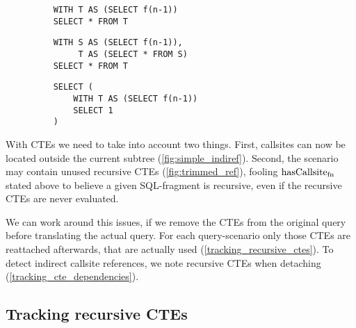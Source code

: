 \begin{wrapfigure}{r}{.5\textwidth}
    \begin{minipage}{\linewidth}
    \centering \captionsetup[subfigure]{justification=centering}
    \begin{verbatim}
    WITH T AS (SELECT f(n-1))
    SELECT * FROM T
    \end{verbatim}
    \label{fig:simple_indiref}\par\vfill
    \begin{verbatim}
    WITH S AS (SELECT f(n-1)),
         T AS (SELECT * FROM S)
    SELECT * FROM T
    \end{verbatim}
    \label{fib_nonrec_scenarios}\par\vfill
    \begin{verbatim}
    SELECT (
        WITH T AS (SELECT f(n-1))
        SELECT 1
    )
    \end{verbatim}
    \label{fig:trimmed_ref}
\end{minipage}
\caption{}
\label{lst:indirect_callsite_ref}
\end{wrapfigure}

With CTEs we need to take into account two things. First, callsites can now be located outside the current subtree (\autoref{fig:simple_indiref}). Second, the scenario may contain unused recursive CTEs (\autoref{fig:trimmed_ref}), fooling $\operatorname{\text{hasCallsite}_{fn}}$ stated above to believe a given SQL-fragment is recursive, even if the recursive CTEs are never evaluated.

We can work around this issues, if we remove the CTEs from the original query before translating the actual query. For each query-scenario only those CTEs are reattached afterwards, that are actually used (\autoref{tracking_recursive_ctes}). To detect indirect callsite references, we note recursive CTEs when detaching (\autoref{tracking_cte_dependencies}).

\subsection{Tracking recursive CTEs}\label{tracking_recursive_ctes}

